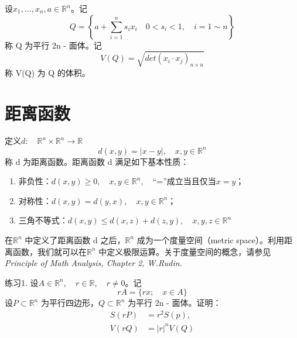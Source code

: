 \documentclass{article}
\begin{document}
\vspace{30pt}

设\(x_1,\dots ,x_n, a \in \mathbb{R}^n\)。记
\begin{equation*}
    Q = \left\{a + \sum_{i = 1}^n s_i x_i\quad 0 < s_i < 1,\quad i = 1 \sim n\right\}
\end{equation*}
称 Q 为平行 2n - 面体。记
\begin{equation*}
    V(Q) = \sqrt{det(x_i \cdot x_j)_{n \times n}}
\end{equation*}
称 V(Q) 为 Q 的体积。

\newpage

\section{距离函数}

定义\(d:\quad \mathbb{R}^n \times \mathbb{R}^n \to \mathbb{R}\)
\begin{equation*}
    d(x, y) = |x - y|,\quad x,y \in \mathbb{R}^n
\end{equation*}
称 d 为距离函数。距离函数 d 满足如下基本性质：
\begin{enumerate}
    \item 非负性：\(d(x, y) \ge 0,\quad x, y \in \mathbb{R}^n,\quad \)“=”成立当且仅当\(x = y\)；
    \item 对称性：\(d(x, y) = d(y, x),\quad x, y \in \mathbb{R}^n\)；
    \item 三角不等式：\(d(x, y) \le d(x, z) + d(z, y),\quad x, y, z \in \mathbb{R}^n\)
\end{enumerate}

\vspace{10pt}

在\(\mathbb{R}^n\) 中定义了距离函数 d 之后，\(\mathbb{R}^n\) 成为一个度量空间（metric space）。利用距离函数，我们就可以在\(\mathbb{R}^n\) 中定义极限运算。关于度量空间的概念，请参见 \textit{Principle of Math Analysis, Chapter 2, W.Rudin.}

\newpage

练习1. 设\(A \in \mathbb{R}^n,\quad r \in \mathbb{R},\quad r \neq 0\)。记
\begin{equation*}
    r A = \{rx;\quad x \in A\}
\end{equation*}
设\(P \subset \mathbb{R}^n\) 为平行四边形，\(Q \subset \mathbb{R}^n\) 为平行 2n - 面体。证明：
\begin{align*}
    S(r P) &=  r^2S(p), \\
    V(r Q) &= |r|^n V(Q)
\end{align*}
\end{document}
